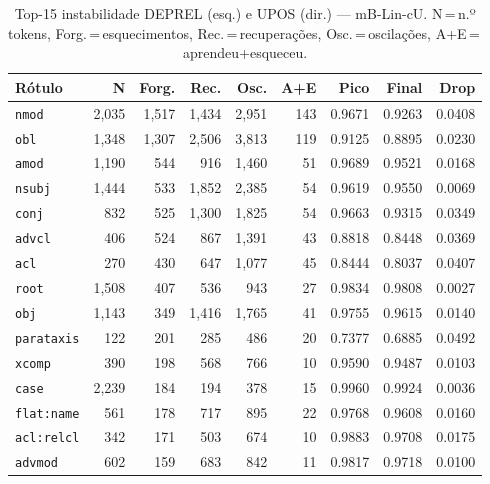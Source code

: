 

\begin{table}[ht]
\centering
\caption{Top-15 instabilidade DEPREL (esq.) e UPOS (dir.) --- mB-Lin-cU. N\,=\,n.º tokens, Forg.\,=\,esquecimentos, Rec.\,=\,recuperações, Osc.\,=\,oscilações, A+E\,=\,aprendeu+esqueceu.}
\label{tab:inst-predictions-results-mbert-linear}
\begin{minipage}[t]{0.54\linewidth}
\centering\tiny
\begin{tabular}{lrrrrrrrr}
\toprule
\textbf{Rótulo} & \textbf{N} & \textbf{Forg.} & \textbf{Rec.} & \textbf{Osc.} & \textbf{A+E} & \textbf{Pico} & \textbf{Final} & \textbf{Drop} \\
\midrule
\texttt{nmod} & 2,035 & 1,517 & 1,434 & 2,951 & 143 & 0.9671 & 0.9263 & 0.0408 \\
\texttt{obl} & 1,348 & 1,307 & 2,506 & 3,813 & 119 & 0.9125 & 0.8895 & 0.0230 \\
\texttt{amod} & 1,190 & 544 & 916 & 1,460 & 51 & 0.9689 & 0.9521 & 0.0168 \\
\texttt{nsubj} & 1,444 & 533 & 1,852 & 2,385 & 54 & 0.9619 & 0.9550 & 0.0069 \\
\texttt{conj} & 832 & 525 & 1,300 & 1,825 & 54 & 0.9663 & 0.9315 & 0.0349 \\
\texttt{advcl} & 406 & 524 & 867 & 1,391 & 43 & 0.8818 & 0.8448 & 0.0369 \\
\texttt{acl} & 270 & 430 & 647 & 1,077 & 45 & 0.8444 & 0.8037 & 0.0407 \\
\texttt{root} & 1,508 & 407 & 536 & 943 & 27 & 0.9834 & 0.9808 & 0.0027 \\
\texttt{obj} & 1,143 & 349 & 1,416 & 1,765 & 41 & 0.9755 & 0.9615 & 0.0140 \\
\texttt{parataxis} & 122 & 201 & 285 & 486 & 20 & 0.7377 & 0.6885 & 0.0492 \\
\texttt{xcomp} & 390 & 198 & 568 & 766 & 10 & 0.9590 & 0.9487 & 0.0103 \\
\texttt{case} & 2,239 & 184 & 194 & 378 & 15 & 0.9960 & 0.9924 & 0.0036 \\
\texttt{flat\!:\!name} & 561 & 178 & 717 & 895 & 22 & 0.9768 & 0.9608 & 0.0160 \\
\texttt{acl\!:\!relcl} & 342 & 171 & 503 & 674 & 10 & 0.9883 & 0.9708 & 0.0175 \\
\texttt{advmod} & 602 & 159 & 683 & 842 & 11 & 0.9817 & 0.9718 & 0.0100 \\
\bottomrule
\end{tabular}
\end{minipage}

\end{table}

